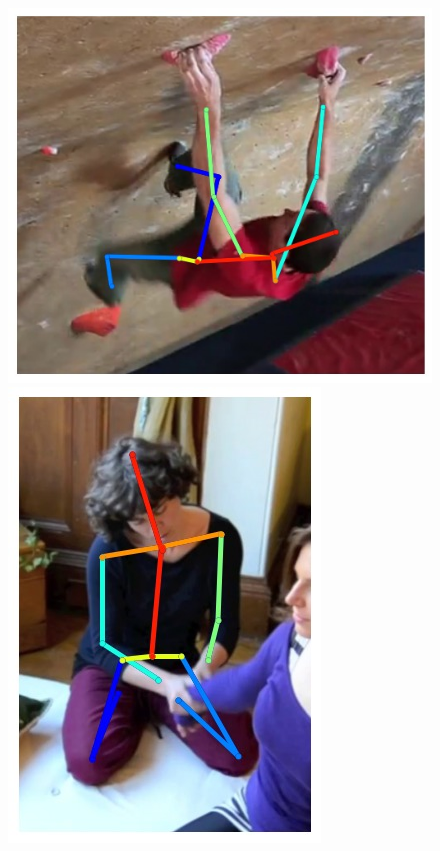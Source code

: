 \begin{figure}[t!]
    \hfill
    \includegraphics[height=\flowh]{Figures/pose/qualitative/pred-10}
    \hfill
    \includegraphics[height=\flowh]{Figures/pose/qualitative/pred-11}
    \hfill

\end{figure}
